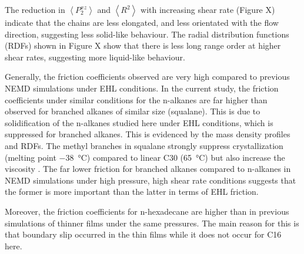 \documentclass[aps,prb,reprint,superscriptaddress, a4paper]{revtex4-1}
\begin{document}
The reduction in $\left<P_{2}^{xz} \right> $ and $\left< R^2 \right>$ with increasing shear rate (Figure X) indicate that the chains are less elongated, and less orientated with the flow direction, suggesting less solid-like behaviour. The radial distribution functions (RDFs) shown in Figure X show that there is less long range order at higher shear rates, suggesting more liquid-like behaviour.

Generally, the friction coefficients observed are very high compared to previous NEMD simulations under EHL conditions. In the current study, the friction coefficients under similar conditions for the n-alkanes are far higher than observed for branched alkanes of similar size (squalane)\cite{Ewen2017a}. This is due to solidification of the n-alkanes studied here under EHL conditions, which is suppressed for branched alkanes. This is evidenced by the mass density profiles and RDFs. The methyl branches in squalane strongly suppress crystallization (melting point \SI{-38}{\celsius}) compared to linear C30 (\SI{65}{\celsius}) but also increase the viscosity \cite{Jabbarzadeh2002}. The far lower friction for branched alkanes compared to n-alkanes in NEMD simulations under high pressure, high shear rate conditions suggests that the former is more important than the latter in terms of EHL friction.

Moreover, the friction coefficients for n-hexadecane are higher than in previous simulations of thinner films under the same pressures\cite{Ta2017}. The main reason for this is that boundary slip occurred in the thin films while it does not occur for C16 here.
\end{document}
